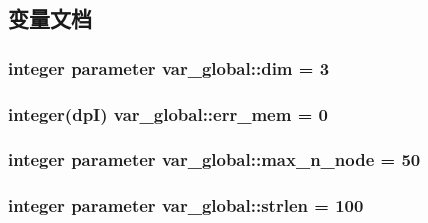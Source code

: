 \subsection{变量文档}
\hypertarget{namespacevar__global_a6f0b7961ebb0eb949c22bc56c0b4065b}{
\subsubsection[{dim}]{\setlength{\rightskip}{0pt plus 5cm}integer parameter {\bf var\_\-global::dim} = 3}}
\label{namespacevar__global_a6f0b7961ebb0eb949c22bc56c0b4065b}
\hypertarget{namespacevar__global_a5991406705b67a341f8f8b4619c270b4}{
\subsubsection[{err\_\-mem}]{\setlength{\rightskip}{0pt plus 5cm}integer(dpI) {\bf var\_\-global::err\_\-mem} = 0}}
\label{namespacevar__global_a5991406705b67a341f8f8b4619c270b4}
\hypertarget{namespacevar__global_aaf3293fc78e326c60e3239dd8b665cb7}{
\subsubsection[{max\_\-n\_\-node}]{\setlength{\rightskip}{0pt plus 5cm}integer parameter {\bf var\_\-global::max\_\-n\_\-node} = 50}}
\label{namespacevar__global_aaf3293fc78e326c60e3239dd8b665cb7}
\hypertarget{namespacevar__global_afc73e7807a439bf3bc26589423ae3c91}{
\subsubsection[{strlen}]{\setlength{\rightskip}{0pt plus 5cm}integer parameter {\bf var\_\-global::strlen} = 100}}
\label{namespacevar__global_afc73e7807a439bf3bc26589423ae3c91}

